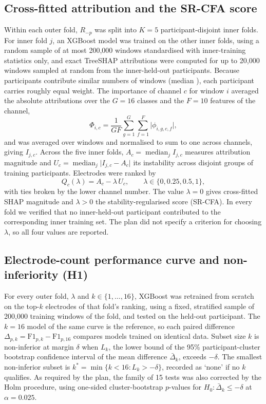 \subsection{Cross-fitted attribution and the SR-CFA score}
Within each outer fold, $R_{-p}$ was split into $K = 5$ participant-disjoint inner folds. For inner fold $j$, an XGBoost model was trained on the other inner folds, using a random sample of at most 200,000 windows standardised with inner-training statistics only, and exact TreeSHAP attributions \citep{lundberg2020local} were computed for up to 20,000 windows sampled at random from the inner-held-out participants. Because participants contribute similar numbers of windows (median \TestWindowsPerParticipant), each participant carries roughly equal weight. The importance of channel $c$ for window $i$ averaged the absolute attributions over the $G = 16$ classes and the $F = 10$ features of the channel,
\begin{equation}
\Phi_{i,c} = \frac{1}{G F}\sum_{g=1}^{G}\sum_{f=1}^{F} \lvert \phi_{i,g,c,f} \rvert ,
\end{equation}
and was averaged over windows and normalised to sum to one across channels, giving $I_{j,c}$. Across the five inner folds, $A_c = \operatorname{median}_j I_{j,c}$ measures attribution magnitude and $U_c = \operatorname{median}_j \lvert I_{j,c} - A_c \rvert$ its instability across disjoint groups of training participants. Electrodes were ranked by
\begin{equation}
Q_c(\lambda) = A_c - \lambda\, U_c , \qquad \lambda \in \{0, 0.25, 0.5, 1\},
\label{eq:srcfa}
\end{equation}
with ties broken by the lower channel number. The value $\lambda = 0$ gives cross-fitted SHAP magnitude and $\lambda > 0$ the stability-regularised score (SR-CFA). In every fold we verified that no inner-held-out participant contributed to the corresponding inner training set. The plan did not specify a criterion for choosing $\lambda$, so all four values are reported.

\subsection{Electrode-count performance curve and non-inferiority (H1)}
For every outer fold, $\lambda$ and $k \in \{1,\ldots,16\}$, XGBoost was retrained from scratch on the top-$k$ electrodes of that fold's ranking, using a fixed, stratified sample of 200,000 training windows of the fold, and tested on the held-out participant. The $k = 16$ model of the same curve is the reference, so each paired difference $\Delta_{p,k} = \mathrm{F1}_{p,k} - \mathrm{F1}_{p,16}$ compares models trained on identical data. Subset size $k$ is non-inferior at margin $\delta$ when $L_k$, the lower bound of the 95\% participant-cluster bootstrap confidence interval of the mean difference $\bar\Delta_k$, exceeds $-\delta$. The smallest non-inferior subset is $k^* = \min\{k < 16 : L_k > -\delta\}$, recorded as `none' if no $k$ qualifies. As required by the plan, the family of 15 tests was also corrected by the Holm procedure, using one-sided cluster-bootstrap $p$-values for $H_0\colon \bar\Delta_k \le -\delta$ at $\alpha = 0.025$.

